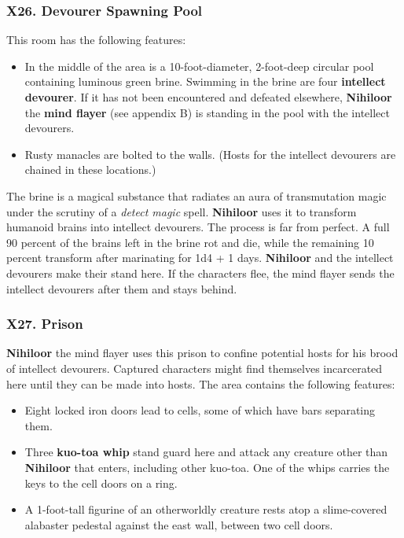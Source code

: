 \documentclass[10pt,a4paper,twoside,twocolumn,openany,nodeprecatedcode]{dndbook}
\begin{document}
\subsubsection{X26. Devourer Spawning Pool}
This room has the following features:
\begin{itemize}

\item In the middle of the area is a 10-foot-diameter, 2-foot-deep circular pool containing luminous green brine. Swimming in the brine are four \textbf{intellect devourer}. If it has not been encountered and defeated elsewhere, \textbf{Nihiloor} the \textbf{mind flayer} (see appendix B) is standing in the pool with the intellect devourers.
\item Rusty manacles are bolted to the walls. (Hosts for the intellect devourers are chained in these locations.)
\end{itemize}


The brine is a magical substance that radiates an aura of transmutation magic under the scrutiny of a \textit{detect magic} spell. \textbf{Nihiloor} uses it to transform humanoid brains into intellect devourers. The process is far from perfect. A full 90 percent of the brains left in the brine rot and die, while the remaining 10 percent transform after marinating for 1d4 + 1 days.
\textbf{Nihiloor} and the intellect devourers make their stand here. If the characters flee, the mind flayer sends the intellect devourers after them and stays behind.
\subsubsection{X27. Prison}
\textbf{Nihiloor} the mind flayer uses this prison to confine potential hosts for his brood of intellect devourers. Captured characters might find themselves incarcerated here until they can be made into hosts. The area contains the following features:
\begin{itemize}

\item Eight locked iron doors lead to cells, some of which have bars separating them.
\item Three \textbf{kuo-toa whip} stand guard here and attack any creature other than \textbf{Nihiloor} that enters, including other kuo-toa. One of the whips carries the keys to the cell doors on a ring.
\item A 1-foot-tall figurine of an otherworldly creature rests atop a slime-covered alabaster pedestal against the east wall, between two cell doors.
\end{itemize}
\end{document}
